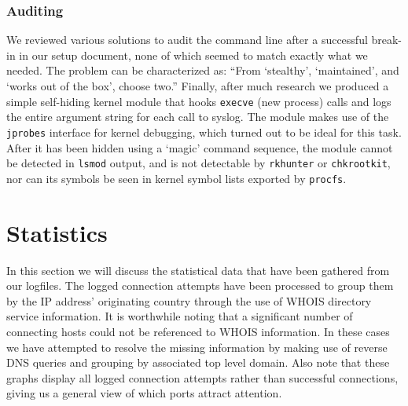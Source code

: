 \documentclass[11pt]{article}
\begin{document}
\subsubsection{Auditing}
We reviewed various solutions to audit the command line after a successful break-in in our setup document, none of which seemed to match exactly what we needed.
The problem can be characterized as: ``From `stealthy', `maintained', and `works out of the box', choose two.''
Finally, after much research we produced a simple self-hiding kernel module that hooks \verb|execve| (new process) calls and logs the entire argument string for each call to syslog.
The module makes use of the \verb|jprobes| interface for kernel debugging, which turned out to be ideal for this task.
After it has been hidden using a `magic' command sequence, the module cannot be detected in \verb|lsmod| output, and is not detectable by \verb|rkhunter| or \verb|chkrootkit|, nor can its symbols be seen in kernel symbol lists exported by \verb|procfs|.




\section{Statistics}
\label{Statistics}
In this section we will discuss the statistical data that have been gathered from our logfiles. 
The logged connection attempts have been processed to group them by the IP address' originating country through the use of WHOIS directory service information.
It is worthwhile noting that a significant number of connecting hosts could not be referenced to WHOIS information.
In these cases we have attempted to resolve the missing information by making use of reverse DNS queries and grouping by associated top level domain.
Also note that these graphs display all logged connection attempts rather than successful connections, giving us a general view of which ports attract attention.
\end{document}
